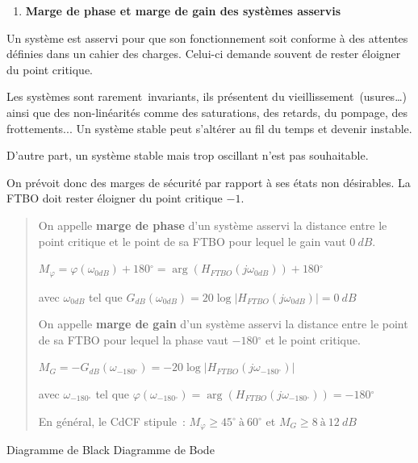 \begin{enumerate}
\def\labelenumi{\arabic{enumi}.}
\setcounter{enumi}{1}
\item
  \protect\hypertarget{_Toc59134858}{}{}\textbf{Marge de phase et marge de gain des systèmes asservis}
\end{enumerate}

Un système est asservi pour que son fonctionnement soit conforme à des attentes définies dans un cahier des charges. Celui-ci demande souvent de rester éloigner du point critique.

Les systèmes sont rarement~invariants, ils présentent du vieillissement~(usures\ldots) ainsi que des non-linéarités comme des saturations, des retards, du pompage, des frottements... Un système stable peut s'altérer au fil du temps et devenir instable.

D'autre part, un système stable mais trop oscillant n'est pas souhaitable.

On prévoit donc des marges de sécurité par rapport à ses états non désirables. La FTBO doit rester éloigner du point critique \(- 1\).

\begin{quote}
On appelle \textbf{marge de phase} d'un système asservi la distance entre le point critique et le point de sa FTBO pour lequel le gain vaut \(0\ dB\).

\(M_{\varphi} = \varphi{(\omega_{0dB})} + 180{^\circ} = \arg{\left( H_{FTBO}\left( j\omega_{0dB} \right) \right) + 180{^\circ}}\)

avec \(\omega_{0dB}\) tel que \(G_{dB}\left( \omega_{0dB} \right) = 20\log{\left| H_{FTBO}\left( j\omega_{0dB} \right) \right| = 0\ dB}\)

On appelle \textbf{marge de gain} d'un système asservi la distance entre le point de sa FTBO pour lequel la phase vaut \(- 180{^\circ}\) et le point critique.

\(M_{G} = - G_{dB}\left( \omega_{- 180{^\circ}} \right) = - 20\log\left| H_{FTBO}\left( j\omega_{- 180{^\circ}} \right) \right|\)

avec \(\omega_{- 180{^\circ}}\) tel que \(\varphi{(\omega_{- 180{^\circ}})} = \arg\left( H_{FTBO}\left( j\omega_{- 180{^\circ}} \right) \right) = - 180{^\circ}\)

En général, le CdCF stipule~: \(M_{\varphi} \geq 45{^\circ}\ à\ 60{^\circ}\) et \(M_{G} \geq 8\ à\ 12\ dB\)
\end{quote}

Diagramme de Black Diagramme de Bode

